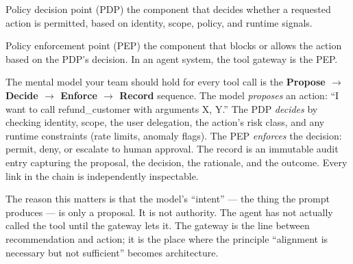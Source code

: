 \begin{TNdefinition}{Policy decision point (PDP)}
the component that decides whether a requested action is permitted, based on identity, scope, policy, and runtime signals.
\end{TNdefinition}

\begin{TNdefinition}{Policy enforcement point (PEP)}
the component that blocks or allows the action based on the PDP's decision. In an agent system, the tool gateway is the PEP.
\end{TNdefinition}

The mental model your team should hold for every tool call is the \textbf{Propose $\rightarrow$ Decide $\rightarrow$ Enforce $\rightarrow$ Record} sequence. The model \textit{proposes} an action: ``I want to call refund\_customer with arguments X, Y.'' The PDP \textit{decides} by checking identity, scope, the user delegation, the action's risk class, and any runtime constraints (rate limits, anomaly flags). The PEP \textit{enforces} the decision: permit, deny, or escalate to human approval. The record is an immutable audit entry capturing the proposal, the decision, the rationale, and the outcome. Every link in the chain is independently inspectable.

The reason this matters is that the model's ``intent'' --- the thing the prompt produces --- is only a proposal. It is not authority. The agent has not actually called the tool until the gateway lets it. The gateway is the line between recommendation and action; it is the place where the principle ``alignment is necessary but not sufficient'' becomes architecture.

